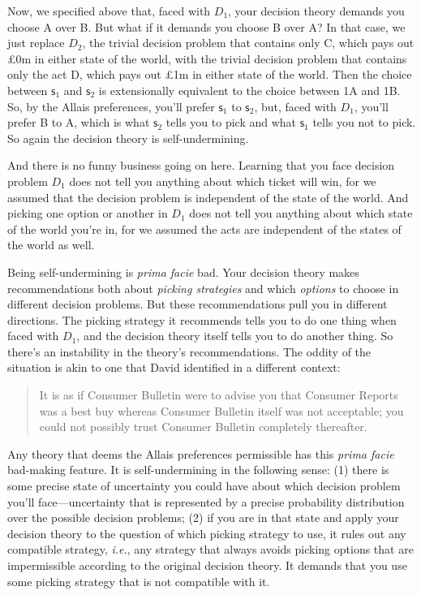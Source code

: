 \documentclass[a4paper]{article}
\newcommand\s{\mathsf{s}}
\newenvironment{CCM rewritten}
{\begingroup\color{blue}} %
{\endgroup}              %
\begin{document}
Now, we specified above that, faced with $D_1$, your decision theory demands you choose A over B. But what if it demands you choose B over A? In that case, we just replace $D_2$, the trivial decision problem that contains only C, which pays out \pounds 0m in either state of the world, with the trivial decision problem that contains only the act D, which pays out \pounds 1m in either state of the world. Then the choice between $\s_1$ and $\s_2$ is extensionally equivalent to the choice between 1A and 1B. So, by the Allais preferences, you'll prefer $\s_1$ to $\s_2$, but, faced with $D_1$, you'll prefer B to A, which is what $\s_2$ tells you to pick and what $\s_1$ tells you not to pick. So again the decision theory is self-undermining.

And there is no funny business going on here. Learning that you face decision problem $D_1$ does not tell you anything about which ticket will win, for we assumed that the decision problem is independent of the state of the world. And picking one option or another in $D_1$ does not tell you anything about which state of the world you're in, for we assumed the acts are independent of the states of the world as well.


Being self-undermining is \textit{prima facie} bad. Your decision theory makes recommendations both about \textit{picking strategies} and which \textit{options} to choose in different decision problems. But these recommendations pull you in different directions. The picking strategy it recommends tells you to do one thing when faced with $D_1$, and the decision theory itself tells you to do another thing. So there's an instability in the theory's recommendations. The oddity of the situation is akin to one that David \citet[56]{lewis1971iim} identified in a different context:
\begin{quote}
It is as if Consumer Bulletin were to advise you that Consumer Reports was a best
buy whereas Consumer Bulletin itself was not acceptable; you could not possibly
trust Consumer Bulletin completely thereafter.
\end{quote}

Any theory that deems the Allais preferences permissible has this \textit{prima facie} bad-making feature. It is self-undermining in the following sense: (1) there is some precise state of uncertainty you could have about which decision problem you'll face---uncertainty that is represented by a precise probability distribution over the possible decision problems; (2) if you are in that state and apply your decision theory to the question of which picking strategy to use, it rules out any compatible strategy, \textit{i.e.}, any strategy that always avoids picking options that are impermissible according to the original decision theory. %
It demands that you use some picking strategy that is not compatible with it. 
\end{document}
